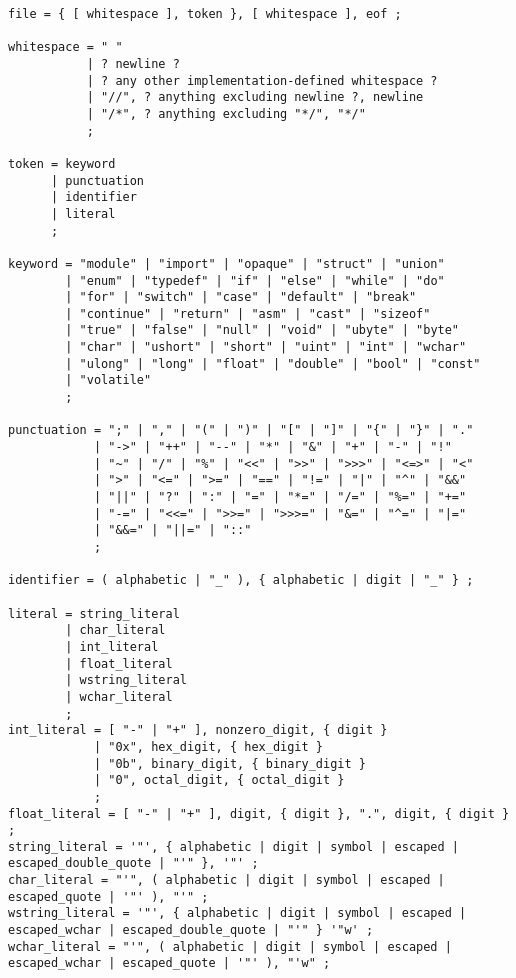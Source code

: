 \documentclass[letterpaper,12pt]{book}
\begin{document}
\begin{lstlisting}[breaklines=true]
file = { [ whitespace ], token }, [ whitespace ], eof ;

whitespace = " "
           | ? newline ?
           | ? any other implementation-defined whitespace ?
           | "//", ? anything excluding newline ?, newline
           | "/*", ? anything excluding "*/", "*/"
           ;

token = keyword
      | punctuation
      | identifier
      | literal
      ;

keyword = "module" | "import" | "opaque" | "struct" | "union"
        | "enum" | "typedef" | "if" | "else" | "while" | "do"
        | "for" | "switch" | "case" | "default" | "break"
        | "continue" | "return" | "asm" | "cast" | "sizeof"
        | "true" | "false" | "null" | "void" | "ubyte" | "byte"
        | "char" | "ushort" | "short" | "uint" | "int" | "wchar"
        | "ulong" | "long" | "float" | "double" | "bool" | "const"
        | "volatile"
        ;

punctuation = ";" | "," | "(" | ")" | "[" | "]" | "{" | "}" | "."
            | "->" | "++" | "--" | "*" | "&" | "+" | "-" | "!"
            | "~" | "/" | "%" | "<<" | ">>" | ">>>" | "<=>" | "<"
            | ">" | "<=" | ">=" | "==" | "!=" | "|" | "^" | "&&"
            | "||" | "?" | ":" | "=" | "*=" | "/=" | "%=" | "+="
            | "-=" | "<<=" | ">>=" | ">>>=" | "&=" | "^=" | "|="
            | "&&=" | "||=" | "::"
            ;

identifier = ( alphabetic | "_" ), { alphabetic | digit | "_" } ;

literal = string_literal
        | char_literal
        | int_literal
        | float_literal
        | wstring_literal
        | wchar_literal
        ;
int_literal = [ "-" | "+" ], nonzero_digit, { digit }
            | "0x", hex_digit, { hex_digit }
            | "0b", binary_digit, { binary_digit }
            | "0", octal_digit, { octal_digit }
            ;
float_literal = [ "-" | "+" ], digit, { digit }, ".", digit, { digit } ;
string_literal = '"', { alphabetic | digit | symbol | escaped | escaped_double_quote | "'" }, '"' ;
char_literal = "'", ( alphabetic | digit | symbol | escaped | escaped_quote | '"' ), "'" ;
wstring_literal = '"', { alphabetic | digit | symbol | escaped | escaped_wchar | escaped_double_quote | "'" } '"w' ;
wchar_literal = "'", ( alphabetic | digit | symbol | escaped | escaped_wchar | escaped_quote | '"' ), "'w" ;


\end{lstlisting}
\end{document}
